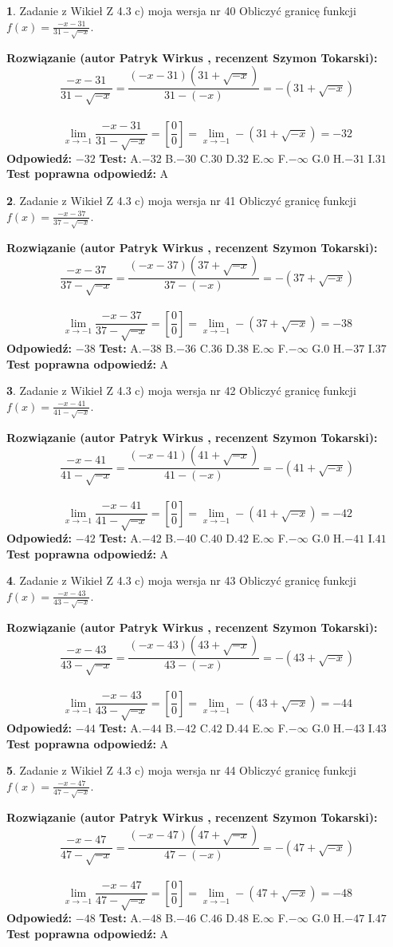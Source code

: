 \documentclass[12pt, a4paper]{article}
\theoremstyle{definition} %
\newtheorem{zad}{}
\newcommand{\zadStart}[1]{\begin{zad}#1\newline}
\newcommand{\zadStop}{\end{zad}}
\newcommand{\rozwStart}[2]{\noindent \textbf{Rozwiązanie (autor #1 , recenzent #2): }\newline}
\newcommand{\rozwStop}{\newline}
\newcommand{\odpStart}{\noindent \textbf{Odpowiedź:}\newline}
\newcommand{\odpStop}{\newline}
\newcommand{\testStart}{\noindent \textbf{Test:}\newline}
\newcommand{\testStop}{\newline}
\newcommand{\kluczStart}{\noindent \textbf{Test poprawna odpowiedź:}\newline}
\newcommand{\kluczStop}{\newline}
\begin{document}
\zadStart{Zadanie z Wikieł Z 4.3 c) moja wersja nr 40}
Obliczyć granicę funkcji $f(x)=\frac{-x-31}{31-\sqrt{-x}}$.
\zadStop
\rozwStart{Patryk Wirkus}{Szymon Tokarski}
$$\frac{-x-31}{31-\sqrt{-x}}=\frac{(-x-31)(31+\sqrt{-x})}{31-(-x)}=-(31+\sqrt{-x})$$
\\
$$\lim\limits_{x\to-1}\frac{-x-31}{31-\sqrt{-x}}=[\frac{0}{0}]=\lim\limits_{x\to-1}-(31+\sqrt{-x}) =-32$$
\rozwStop
\odpStart
$-32$
\odpStop
\testStart
A.$-32$
B.$-30$
C.$30$
D.$32$
E.$\infty$
F.$-\infty$
G.$0$
H.$-31$
I.$31$
\testStop
\kluczStart
A
\kluczStop



\zadStart{Zadanie z Wikieł Z 4.3 c) moja wersja nr 41}
Obliczyć granicę funkcji $f(x)=\frac{-x-37}{37-\sqrt{-x}}$.
\zadStop
\rozwStart{Patryk Wirkus}{Szymon Tokarski}
$$\frac{-x-37}{37-\sqrt{-x}}=\frac{(-x-37)(37+\sqrt{-x})}{37-(-x)}=-(37+\sqrt{-x})$$
\\
$$\lim\limits_{x\to-1}\frac{-x-37}{37-\sqrt{-x}}=[\frac{0}{0}]=\lim\limits_{x\to-1}-(37+\sqrt{-x}) =-38$$
\rozwStop
\odpStart
$-38$
\odpStop
\testStart
A.$-38$
B.$-36$
C.$36$
D.$38$
E.$\infty$
F.$-\infty$
G.$0$
H.$-37$
I.$37$
\testStop
\kluczStart
A
\kluczStop



\zadStart{Zadanie z Wikieł Z 4.3 c) moja wersja nr 42}
Obliczyć granicę funkcji $f(x)=\frac{-x-41}{41-\sqrt{-x}}$.
\zadStop
\rozwStart{Patryk Wirkus}{Szymon Tokarski}
$$\frac{-x-41}{41-\sqrt{-x}}=\frac{(-x-41)(41+\sqrt{-x})}{41-(-x)}=-(41+\sqrt{-x})$$
\\
$$\lim\limits_{x\to-1}\frac{-x-41}{41-\sqrt{-x}}=[\frac{0}{0}]=\lim\limits_{x\to-1}-(41+\sqrt{-x}) =-42$$
\rozwStop
\odpStart
$-42$
\odpStop
\testStart
A.$-42$
B.$-40$
C.$40$
D.$42$
E.$\infty$
F.$-\infty$
G.$0$
H.$-41$
I.$41$
\testStop
\kluczStart
A
\kluczStop



\zadStart{Zadanie z Wikieł Z 4.3 c) moja wersja nr 43}
Obliczyć granicę funkcji $f(x)=\frac{-x-43}{43-\sqrt{-x}}$.
\zadStop
\rozwStart{Patryk Wirkus}{Szymon Tokarski}
$$\frac{-x-43}{43-\sqrt{-x}}=\frac{(-x-43)(43+\sqrt{-x})}{43-(-x)}=-(43+\sqrt{-x})$$
\\
$$\lim\limits_{x\to-1}\frac{-x-43}{43-\sqrt{-x}}=[\frac{0}{0}]=\lim\limits_{x\to-1}-(43+\sqrt{-x}) =-44$$
\rozwStop
\odpStart
$-44$
\odpStop
\testStart
A.$-44$
B.$-42$
C.$42$
D.$44$
E.$\infty$
F.$-\infty$
G.$0$
H.$-43$
I.$43$
\testStop
\kluczStart
A
\kluczStop



\zadStart{Zadanie z Wikieł Z 4.3 c) moja wersja nr 44}
Obliczyć granicę funkcji $f(x)=\frac{-x-47}{47-\sqrt{-x}}$.
\zadStop
\rozwStart{Patryk Wirkus}{Szymon Tokarski}
$$\frac{-x-47}{47-\sqrt{-x}}=\frac{(-x-47)(47+\sqrt{-x})}{47-(-x)}=-(47+\sqrt{-x})$$
\\
$$\lim\limits_{x\to-1}\frac{-x-47}{47-\sqrt{-x}}=[\frac{0}{0}]=\lim\limits_{x\to-1}-(47+\sqrt{-x}) =-48$$
\rozwStop
\odpStart
$-48$
\odpStop
\testStart
A.$-48$
B.$-46$
C.$46$
D.$48$
E.$\infty$
F.$-\infty$
G.$0$
H.$-47$
I.$47$
\testStop
\kluczStart
A
\kluczStop
\end{document}
